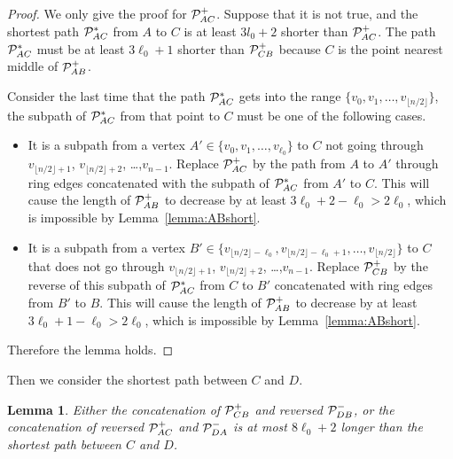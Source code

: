 \documentclass[11pt]{article}
\newtheorem{lem}{Lemma}
\begin{document}
\begin{proof}
We only give the proof for ${\cal P}_{AC}^+$. Suppose that it is not true, and the shortest path ${\cal P}_{AC}^*$ from $A$ to $C$ is at least $3l_0+2$ shorter than ${\cal P}_{AC}^+$. The path ${\cal P}_{AC}^*$ must be at least $3\ell_0+1$ shorter than ${\cal P}_{CB}^+$ because $C$ is the point nearest middle of ${\cal P}_{AB}^+$.

Consider the last time that the path ${\cal P}_{AC}^*$ gets into the range $\{v_0, v_1, \ldots, v_{\lfloor n/2\rfloor}\}$, the subpath of ${\cal P}_{AC}^*$ 
	from that point to $C$ must be one of the following cases.

\begin{itemize}
\item It is a subpath from a vertex $A'\in\{v_0,v_1,\ldots,v_{\ell_0}\}$ to $C$ not going through $v_{\lfloor n/2\rfloor+1}$, $v_{\lfloor n/2\rfloor+2}$, \ldots,$v_{n-1}$. Replace ${\cal P}_{AC}^+$ by the path from $A$ to $A'$ through ring edges concatenated with the subpath of ${\cal P}_{AC}^*$ 
	from $A'$ to $C$. This will cause the length of ${\cal P}_{AB}^+$ to decrease by at least $3\ell_0+2-\ell_0>2\ell_0$, which is impossible by Lemma~\ref{lemma:ABshort}.

\item It is a subpath from a vertex $B'\in\{v_{\lfloor n/2\rfloor-\ell_0},v_{\lfloor n/2\rfloor-\ell_0+1},\ldots,v_{\lfloor n/2\rfloor}\}$ to $C$ that does not go through $v_{\lfloor n/2\rfloor+1}$, $v_{\lfloor n/2\rfloor+2}$, \ldots,$v_{n-1}$. Replace ${\cal P}_{CB}^+$ by the reverse of this subpath of ${\cal P}_{AC}^*$ from $C$ to $B'$ 
	concatenated with ring edges from $B'$ to $B$. 
This will cause the length of ${\cal P}_{AB}^+$ to decrease by at least $3\ell_0+1-\ell_0>2\ell_0$, which is impossible by Lemma~\ref{lemma:ABshort}.
\end{itemize}
Therefore the lemma holds.
\end{proof}

Then we consider the shortest path between $C$ and $D$.

\begin{lem}
Either the concatenation of ${\cal P}_{CB}^+$ and reversed ${\cal P}_{DB}^-$, or the concatenation of reversed ${\cal P}_{AC}^+$ and ${\cal P}_{DA}^-$ is at most $8\ell_0+2$ longer than the shortest path between $C$ and $D$.
\end{lem}
\end{document}
